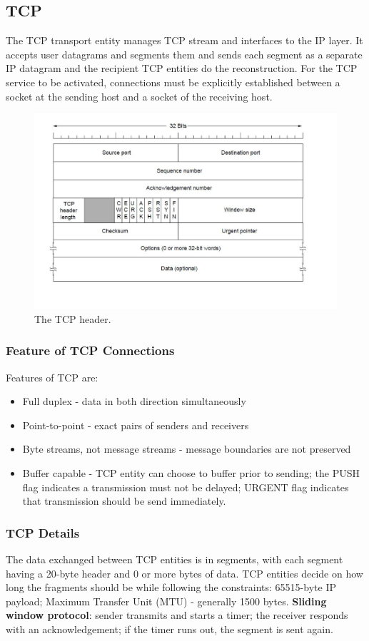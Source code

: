 \documentclass[twoside]{article}
\begin{document}
\subsection{TCP}
The TCP transport entity manages TCP stream and interfaces to the IP layer. It
accepts user datagrams and segments them and sends each segment as a separate
IP datagram and the recipient TCP entities do the reconstruction. For the TCP
service to be activated, connections must be explicitly established between
a socket at the sending host and a socket of the receiving host.
\begin{figure}
  \includegraphics[width=\linewidth]{tcp-header.png}
  \caption{The TCP header.}
  \label{fig:tcp-header}
\end{figure}
\subsubsection{Feature of TCP Connections}
Features of TCP are:
\begin{itemize}
    \item Full duplex - data in both direction simultaneously
    \item Point-to-point - exact pairs of senders and receivers
    \item Byte streams, not message streams - message boundaries are not
    preserved
    \item Buffer capable - TCP entity can choose to buffer prior to sending; 
    the PUSH flag indicates a transmission must not be delayed; URGENT flag
    indicates that transmission should be send immediately.
\end{itemize}
\subsubsection{TCP Details}
The data exchanged between TCP entities is in segments, with each segment 
having a 20-byte header and 0 or more bytes of data. TCP entities decide
on how long the fragments should be while following the constraints: 65515-byte
IP payload; Maximum Transfer Unit (MTU) - generally 1500 bytes. \textbf{Sliding
window protocol}: sender transmits and starts a timer; the receiver responds 
with an acknowledgement; if the timer runs out, the segment is sent again.
\end{document}
